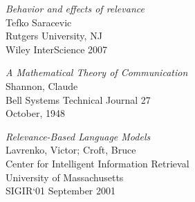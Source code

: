 \documentclass{article}
\newcommand{\bibtitle}[1]{{\it #1}}
\begin{document}
\begin{thebibliography}{99}
        \bibtitle{Behavior and effects of relevance}\\
        Tefko Saracevic\\
        Rutgers University, NJ\\
        Wiley InterScience 2007

        \bibtitle{A Mathematical Theory of Communication} \\
        Shannon, Claude\\
        Bell Systems Technical Journal 27\\
        October, 1948

        \bibtitle{Relevance-Based Language Models}\\
        Lavrenko, Victor; Croft, Bruce\\
        Center for Intelligent Information Retrieval\\
        University of Massachusetts \\
        SIGIR`01 September 2001


\end{thebibliography}
\end{document}
